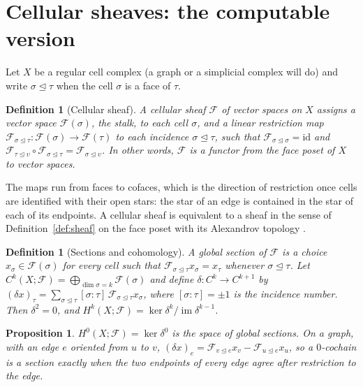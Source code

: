 \documentclass[11pt,a4paper,oneside]{scrartcl}
\theoremstyle{guideplain}
\newtheorem{proposition}[theorem]{Proposition}
\theoremstyle{guidedef}
\newtheorem{definition}[theorem]{Definition}
\newcommand{\F}{\mathcal{F}}
\DeclareMathOperator{\im}{im}
\newcommand{\face}{\trianglelefteq}
\begin{document}
\section{Cellular sheaves: the computable version}\label{sec:cellular}

Let $X$ be a regular cell complex (a graph or a simplicial complex will do) and write
$\sigma\face\tau$ when the cell $\sigma$ is a face of $\tau$.

\begin{definition}[Cellular sheaf]\label{def:cellular}
  A \emph{cellular sheaf} $\F$ of vector spaces on $X$ assigns a vector space $\F(\sigma)$, the
  \emph{stalk}, to each cell $\sigma$, and a linear \emph{restriction map}
  $\F_{\sigma\face\tau}\colon\F(\sigma)\to\F(\tau)$ to each incidence $\sigma\face\tau$, such that
  $\F_{\sigma\face\sigma}=\mathrm{id}$ and
  $\F_{\tau\face\upsilon}\circ\F_{\sigma\face\tau}=\F_{\sigma\face\upsilon}$. In other words, $\F$ is
  a functor from the face poset of $X$ to vector spaces.
\end{definition}

The maps run from faces to cofaces, which is the direction of restriction once cells are identified
with their open stars: the star of an edge is contained in the star of each of its endpoints. A
cellular sheaf is equivalent to a sheaf in the sense of Definition~\ref{def:sheaf} on the face poset
with its Alexandrov topology \autocite{curry2014}.

\begin{definition}[Sections and cohomology]
  A \emph{global section} of $\F$ is a choice $x_\sigma\in\F(\sigma)$ for every cell such that
  $\F_{\sigma\face\tau}x_\sigma=x_\tau$ whenever $\sigma\face\tau$. Let
  $C^k(X;\F)=\bigoplus_{\dim\sigma=k}\F(\sigma)$ and define
  $\delta\colon C^k\to C^{k+1}$ by
  $(\delta x)_\tau=\sum_{\sigma\face\tau}[\sigma:\tau]\,\F_{\sigma\face\tau}x_\sigma$,
  where $[\sigma:\tau]=\pm1$ is the incidence number. Then $\delta^2=0$, and
  $H^k(X;\F)=\ker\delta^k/\im\delta^{k-1}$.
\end{definition}

\begin{proposition}
  $H^0(X;\F)=\ker\delta^0$ is the space of global sections. On a graph, with an edge $e$ oriented
  from $u$ to $v$, $(\delta x)_e=\F_{v\face e}x_v-\F_{u\face e}x_u$, so a $0$-cochain is a section
  exactly when the two endpoints of every edge agree after restriction to the edge.
\end{proposition}
\end{document}
